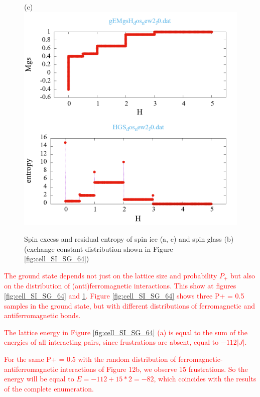 \documentclass[preprint,12pt]{elsarticle}
\begin{document}
\begin{figure}[H]
\begin{minipage}[h]{0.32\linewidth}
	\end{minipage}
	\hfill
	\begin{minipage}[h]{0.32\linewidth}
		\centering(c)
		\includegraphics[width=1\linewidth]{pictures/_multiplot_SI64_J0}
	\end{minipage}
	
	\caption{Spin excess and residual entropy of spin ice (a, c) and spin glass (b) (exchange constant distribution shown in Figure \ref{fig:cell_SI_SG_64})}
	\label{fig:_multiplot_SI_SG_64}
	
\end{figure}

\textcolor{red}{The ground state depends not just on the lattice size and probability $P_+$ but also on the distribution of (anti)ferromagnetic interactions. This show at figures \ref{fig:cell_SI_SG_64} and \ref{fig:_multiplot_SI_SG_64}. Figure \ref{fig:cell_SI_SG_64} shows three P+ = 0.5 samples in the ground state, but with different distributions of ferromagnetic and antiferromagnetic bonds.}

\textcolor{red}{The lattice energy in Figure \ref{fig:cell_SI_SG_64} (a) is equal to the sum of the energies of all interacting pairs, since frustrations are absent, equal to $-112|J|$.}

\textcolor{red}{For the same P+ = 0.5 with the random distribution of ferromagnetic-antiferromagnetic interactions of Figure 12b, we observe 15 frustrations. So the energy will be equal to $E = -112 + 15*2 = -82$, which coincides with the results of the complete enumeration.}
\end{document}

